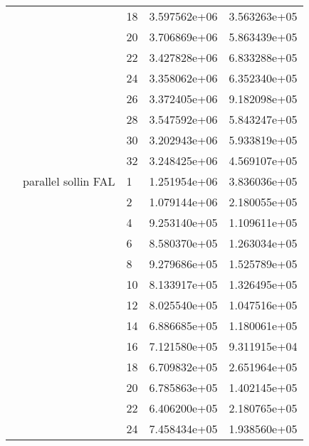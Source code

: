 \begin{tabular}{lllrr}
                      &                     & 18 &  3.597562e+06 &  3.563263e+05 \\
                      &                     & 20 &  3.706869e+06 &  5.863439e+05 \\
                      &                     & 22 &  3.427828e+06 &  6.833288e+05 \\
                      &                     & 24 &  3.358062e+06 &  6.352340e+05 \\
                      &                     & 26 &  3.372405e+06 &  9.182098e+05 \\
                      &                     & 28 &  3.547592e+06 &  5.843247e+05 \\
                      &                     & 30 &  3.202943e+06 &  5.933819e+05 \\
                      &                     & 32 &  3.248425e+06 &  4.569107e+05 \\
                      & parallel sollin FAL & 1  &  1.251954e+06 &  3.836036e+05 \\
                      &                     & 2  &  1.079144e+06 &  2.180055e+05 \\
                      &                     & 4  &  9.253140e+05 &  1.109611e+05 \\
                      &                     & 6  &  8.580370e+05 &  1.263034e+05 \\
                      &                     & 8  &  9.279686e+05 &  1.525789e+05 \\
                      &                     & 10 &  8.133917e+05 &  1.326495e+05 \\
                      &                     & 12 &  8.025540e+05 &  1.047516e+05 \\
                      &                     & 14 &  6.886685e+05 &  1.180061e+05 \\
                      &                     & 16 &  7.121580e+05 &  9.311915e+04 \\
                      &                     & 18 &  6.709832e+05 &  2.651964e+05 \\
                      &                     & 20 &  6.785863e+05 &  1.402145e+05 \\
                      &                     & 22 &  6.406200e+05 &  2.180765e+05 \\
                      &                     & 24 &  7.458434e+05 &  1.938560e+05 \\

\end{tabular}
